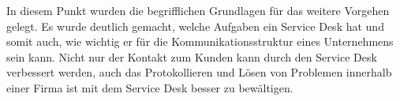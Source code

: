 \noindent
In diesem Punkt wurden die begrifflichen Grundlagen für das weitere Vorgehen gelegt. Es wurde deutlich gemacht, welche Aufgaben ein Service Desk hat und somit auch, wie wichtig er für die Kommunikationsstruktur eines Unternehmens sein kann. Nicht nur der Kontakt zum Kunden kann durch den Service Desk verbessert werden, auch das Protokollieren und Lösen von Problemen innerhalb einer Firma ist mit dem Service Desk besser zu bewältigen.\newline









   


 
